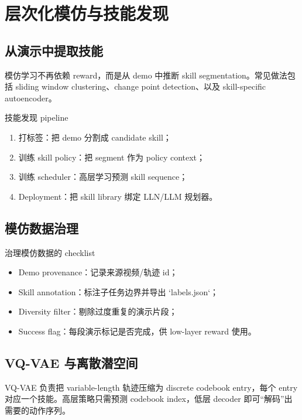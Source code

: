 \section{层次化模仿与技能发现}

\subsection{从演示中提取技能}

模仿学习不再依赖 reward，而是从 demo 中推断 skill segmentation。常见做法包括 sliding window clustering、change point detection、以及 skill-specific autoencoder。

\begin{importantbox}{技能发现 pipeline}
\begin{enumerate}
    \item 打标签：把 demo 分割成 candidate skill；
    \item 训练 skill policy：把 segment 作为 policy context；
    \item 训练 scheduler：高层学习预测 skill sequence；
    \item Deployment：把 skill library 绑定 LLN/LLM 规划器。
\end{enumerate}
\end{importantbox}

\subsection{模仿数据治理}

\begin{knowledgebox}{治理模仿数据的 checklist}
\begin{itemize}
    \item Demo provenance：记录来源视频/轨迹 id；
    \item Skill annotation：标注子任务边界并导出 `labels.json`；
    \item Diversity filter：剔除过度重复的演示片段；
    \item Success flag：每段演示标记是否完成，供 low-layer reward 使用。
\end{itemize}
\end{knowledgebox}

\subsection{VQ-VAE 与离散潜空间}

VQ-VAE 负责把 variable-length 轨迹压缩为 discrete codebook entry，每个 entry 对应一个技能。高层策略只需预测 codebook index，低层 decoder 即可“解码”出需要的动作序列。

